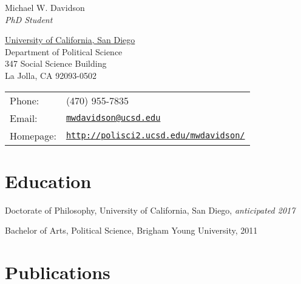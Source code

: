 \documentclass[letterpaper]{article}
\def\name{Michael W. Davidson\\
\emph{\normalsize{PhD Student}}}
\renewenvironment{itemize}{
  \begin{list}{}{
    \setlength{\leftmargin}{1.5em}
  }
}{
  \end{list}
}
\begin{document}
{\huge \name}
\vspace{.5em}
\Xhline{2\arrayrulewidth}


\vspace{0.5em}

\begin{minipage}{0.45\linewidth}
  \href{http://www.ucsd.edu}{University of California, San Diego} \\
  Department of Political Science \\
  347 Social Science Building \\
  La Jolla, CA 92093-0502
\end{minipage}
\begin{minipage}{0.45\linewidth}
  \begin{tabular}{ll}
    Phone: & (470) 955-7835 \\
    Email: & \href{mailto:mwdavidson@ucsd.edu}{\tt mwdavidson@ucsd.edu} \\
    Homepage: & \href{http://polisci2.ucsd.edu/mwdavidson/}{\tt http://polisci2.ucsd.edu/mwdavidson/} \\
  \end{tabular}
\end{minipage}


\section*{Education}

\begin{itemize}
\item Doctorate of Philosophy, University of California, San Diego,
  \emph{anticipated 2017} 

  \item Bachelor of Arts, Political Science, Brigham Young University,
    2011


\end{itemize}

\section*{Publications}


\end{document}
